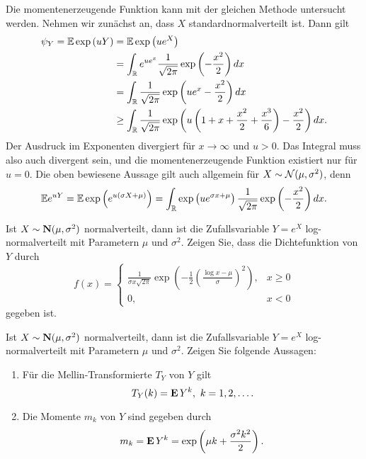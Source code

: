 Die momentenerzeugende Funktion kann mit der gleichen Methode untersucht werden. 
Nehmen wir zunächst an, dass $X$ standardnormalverteilt ist. Dann gilt
\begin{align*}
    \psi_Y = \mathbb{E} \exp \left( uY \right) &= \mathbb{E} \exp \left( u e^{X} \right) \\
    &= \int_{\mathbb{R}} e^{u e^{x}} \frac{1}{\sqrt{ 2 \pi}} \exp \left(  - \frac{x^2}{2}  \right) dx \\
    &= \int_{\mathbb{R}} \frac{1}{\sqrt{2 \pi}} \exp \left(u e^{x} - \frac{x^2}{2} \right)dx \\
    & \geq \int_{\mathbb{R}}^{} \frac{1}{\sqrt{2\pi}} 
    \exp \left( u\left(1 + x + \frac{x^2}{2} + \frac{x^3}{6}\right) - \frac{x^2}{2} \right) dx.
\end{align*}
Der Ausdruck im Exponenten divergiert für $x\to \infty$ und $u>0$. Das Integral muss 
also auch divergent sein, und die momentenerzeugende Funktion existiert nur für $u=0$. 
Die oben bewiesene Aussage gilt auch allgemein für $X \sim \mathcal N (\mu, \sigma^2)$, denn
\begin{equation*}
    \mathbb{E} e^{uY} = \mathbb{E} \exp \left( e^{u (\sigma X + \mu)} \right) = 
    \int_{\mathbb{R}} \exp \left( u e^{\sigma x + \mu} \right) \frac{1}{\sqrt{2\pi}}
    \exp \left( -\frac{x^2}{2} \right) dx. 
\end{equation*}


 Ist $X\sim\mathbf N(\mu,
\sigma^2)$ normalverteilt, dann ist die Zufallsvariable $Y=e^{X}$
log-normalverteilt mit Parametern $\mu$ und $\sigma^{2}$. Zeigen Sie, dass die
Dichtefunktion von $Y$ durch
\begin{equation*}
    f(x) = 
    \begin{cases}
        \frac{1}{\sigma x \sqrt{2\pi}} \exp \left( -\frac{1}{2} \left( \frac{\log x -\mu}{\sigma} \right)^2  \right), & x\geq 0 \\
        0, & x<0
    \end{cases}
\end{equation*} 
gegeben ist.


 Ist $X\sim\mathbf N(\mu, \sigma^2)$
normalverteilt, dann ist die Zufallsvariable $Y=e^{X}$ log-normalverteilt mit
Parametern $\mu$ und $\sigma^{2}$. Zeigen Sie folgende Aussagen: 
\begin{enumerate}
    \item Für die Mellin-Transformierte $T_{Y}$ von $Y$ gilt
        \begin{equation*}
            T_{Y}(k) =  \bfE \, Y^{k}, \ k=1,2,\dots.
        \end{equation*}

    \item Die Momente $m_k$ von $Y$ sind gegeben durch
        \begin{equation*}
            m_{k} = \mathbf E \, Y^{k} = \exp \left( \mu k + \frac{ \sigma^2 k^{2}}{2} \right).
        \end{equation*}
\end{enumerate}



